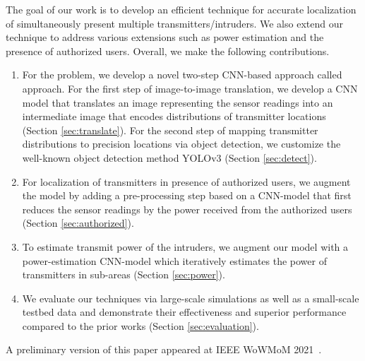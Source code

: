   The goal of our work is to develop an
efficient technique for accurate localization of simultaneously
present multiple transmitters/intruders. We also extend our technique to address various
extensions such as power estimation and the presence of authorized users. Overall, we make the following 
contributions.
\begin{enumerate}
\item
For the \mtl problem, we develop a novel two-step CNN-based approach called \our approach. 
For the first step of image-to-image translation, we develop a CNN model that translates an image representing the sensor readings into an intermediate image that encodes distributions of transmitter locations (Section \ref{sec:translate}). 
For the second step of mapping transmitter distributions to precision locations via object detection,
we customize the well-known  object detection method YOLOv3 (Section \ref{sec:detect}).

\item
For localization of transmitters in presence of authorized users, we 
augment the \our model by adding a pre-processing step based on a 
CNN-model that first reduces the 
sensor readings by the power received from the authorized users (Section \ref{sec:authorized}).

\item
To estimate transmit power of the intruders, we augment our \our model
with a power-estimation CNN-model which iteratively estimates the power of transmitters
in sub-areas (Section \ref{sec:power}).

\item
We evaluate our techniques via large-scale simulations as well as a small-scale testbed data and demonstrate their effectiveness and superior
performance compared to the prior works (Section \ref{sec:evaluation}).
\end{enumerate}

A preliminary version of this paper appeared at IEEE WoWMoM 2021~\cite{wowmom21}.





